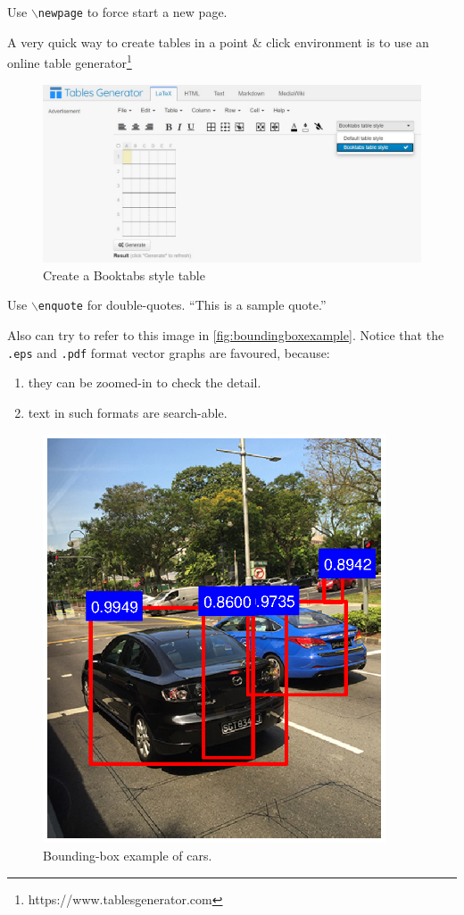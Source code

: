 \begin{spacing}{2.0}
Use  \texttt{$\backslash$newpage} to force start a new page.

\newpage

A very quick way to create tables in a point \& click environment is to use an online table generator\footnote{https://www.tablesgenerator.com}

\begin{figure}[ht]
\centering
\includegraphics[width=14cm, fbox]{Figures/tablesgenerator.jpg}
\caption{Create a Booktabs style table}
\label{fig:tablegenerator} 
\end{figure}

Use  \texttt{$\backslash$enquote} for double-quotes. \enquote{This is a sample quote.}

Also can try to refer to this image in \autoref{fig:boundingboxexample}. Notice that the \texttt{.eps} and \texttt{.pdf} format vector graphs are favoured, because:

\begin{enumerate}
    \item they can be zoomed-in to check the detail.
    \item text in such formats are search-able.
\end{enumerate}


\begin{figure}[ht]
\centering
\includegraphics[width=4in, fbox]{Figures/boundingbox.eps}
\caption{Bounding-box example of cars.}
\label{fig:boundingboxexample} 
\end{figure}


\end{spacing}
